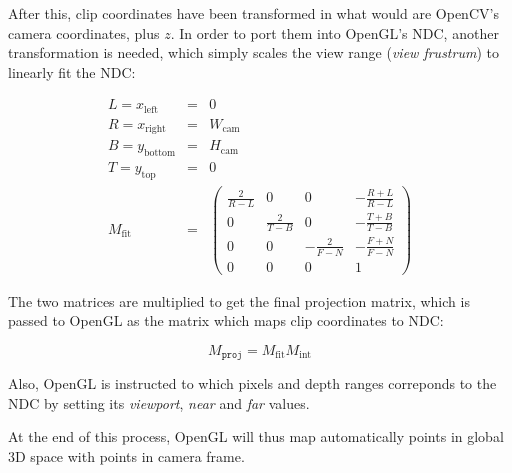 After this, clip coordinates have been transformed in what would are OpenCV's
camera coordinates, plus $z$. In order to port them into OpenGL's NDC, another
transformation is needed, which simply scales the view range (\emph{view
frustrum}) to linearly fit the NDC:

\begin{eqnarray}
  L = x_{\text{left}} & = & 0 \nonumber \\
  R = x_{\text{right}} & = & W_{\text{cam}} \nonumber \\
  B = y_{\text{bottom}} & = & H_{\text{cam}} \nonumber \\
  T = y_{\text{top}} & = & 0 \nonumber \\
  M_{\text{fit}} & = & 
  \begin{pmatrix}
    \frac{2}{R-L} & 0 & 0 & -\frac{R+L}{R-L} \\
    0 & \frac{2}{T-B} & 0 & -\frac{T+B}{T-B} \\
    0 & 0 & -\frac{2}{F-N} & -\frac{F+N}{F-N} \\
    0 & 0 & 0 & 1
  \end{pmatrix}
\end{eqnarray}

The two matrices are multiplied to get the final projection matrix, which is
passed to OpenGL as the matrix which maps clip coordinates to NDC:

\begin{equation}
  M_{\texttt{proj}}=M_{\text{fit}}M_{\text{int}}
\end{equation}

Also, OpenGL is instructed to which pixels and depth ranges correponds to the
NDC by setting its \emph{viewport}, \emph{near} and \emph{far} values.

At the end of this process, OpenGL will thus map automatically points in global
3D space with points in camera frame.

